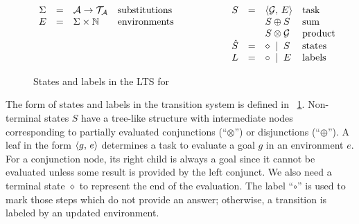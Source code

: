 \begin{figure}[t]
\centering
\[
\begin{array}{ccllcccll}
  \Sigma & = & \mathcal{A} \to \mathcal{T}_\mathcal{A} & \mbox{substitutions} &\qquad\qquad&        S & = & \langle \mathcal{G} ,\, E \rangle & \mbox{task} \\
       E & = & \Sigma \times \mathbb{N}              & \mbox{environments}  &\qquad\qquad&          &   & S \oplus S              & \mbox{sum} \\
         &   &                                       &                      &\qquad\qquad&          &   & S \otimes \mathcal{G}   & \mbox{product} \\
         &   &                                       &                      &\qquad\qquad&  \hat{S} & = & \diamond \; \mid \; S   & \mbox{states} \\
         &   &                                       &                      &\qquad\qquad&        L & = & \circ \; \mid \; E      & \mbox{labels} 
\end{array}
\]
\caption{States and labels in the LTS for \mK}
\label{fig:operanional_semantics_states_labels}
\end{figure}

The form of states and labels in the transition system is defined in \figureword~\ref{fig:operanional_semantics_states_labels}.
Non-terminal states $S$ have a tree-like structure with intermediate nodes corresponding to partially evaluated conjunctions
(``$\otimes$'') or disjunctions (``$\oplus$'').
A leaf in the form $\langle g ,\, e \rangle$ determines a task to evaluate a goal $g$ in an environment $e$. For a conjunction node, its right child
is always a goal since it cannot be evaluated unless some result is provided by the left conjunct.
We also need a terminal state $\diamond$ to represent the end of the evaluation.
The label ``$\circ$'' is used to mark those steps which do not provide an answer; otherwise, a transition is labeled by an updated
environment.

